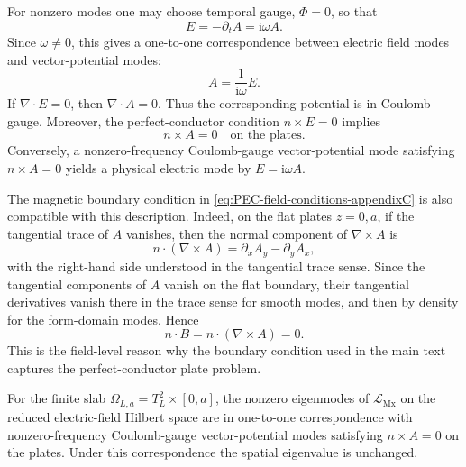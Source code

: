 \documentclass[11pt]{article}
\providecommand{\ii}{\mathrm{i}}
\providecommand{\OmegaLa}{\Omega_{L,a}}
\providecommand{\LMx}{\mathcal L_{\mathrm{Mx}}}
\numberwithin{equation}{section}
\begin{document}
For nonzero modes one may choose temporal gauge, \(\Phi=0\), so that
\begin{equation}
    E=-\partial_t A=\ii\omega A.
    \label{eq:E-iomega-A-appendixC}
\end{equation}
Since \(\omega\neq0\), this gives a one-to-one correspondence between electric
field modes and vector-potential modes:
\begin{equation}
    A=\frac{1}{\ii\omega}E .
    \label{eq:A-from-E-appendixC}
\end{equation}
If \(\nabla\cdot E=0\), then \(\nabla\cdot A=0\).  Thus the corresponding
potential is in Coulomb gauge.  Moreover, the perfect-conductor condition
\(n\times E=0\) implies
\begin{equation}
    n\times A=0
    \quad \text{on the plates}.
    \label{eq:ncrossA-appendixC}
\end{equation}
Conversely, a nonzero-frequency Coulomb-gauge vector-potential mode satisfying
\(n\times A=0\) yields a physical electric mode by \(E=\ii\omega A\).

The magnetic boundary condition in \eqref{eq:PEC-field-conditions-appendixC}
is also compatible with this description.  Indeed, on the flat plates
\(z=0,a\), if the tangential trace of \(A\) vanishes, then the normal component
of \(\nabla\times A\) is
\begin{equation}
    n\cdot(\nabla\times A)
    =\partial_x A_y-\partial_y A_x,
    \label{eq:normal-curl-A-appendixC}
\end{equation}
with the right-hand side understood in the tangential trace sense.  Since the
tangential components of \(A\) vanish on the flat boundary, their tangential
derivatives vanish there in the trace sense for smooth modes, and then by
density for the form-domain modes.  Hence
\begin{equation}
    n\cdot B=n\cdot(\nabla\times A)=0.
    \label{eq:n-dot-B-from-A-appendixC}
\end{equation}
This is the field-level reason why the boundary condition used in the main
text captures the perfect-conductor plate problem.

\begin{proposition}
\label{prop:mode-level-equivalence-A-E}
For the finite slab \(\OmegaLa=T_L^2\times[0,a]\), the nonzero eigenmodes of
\(\LMx\) on the reduced electric-field Hilbert space are in one-to-one
correspondence with nonzero-frequency Coulomb-gauge vector-potential modes
satisfying \(n\times A=0\) on the plates.  Under this correspondence the
spatial eigenvalue is unchanged.
\end{proposition}
\end{document}
